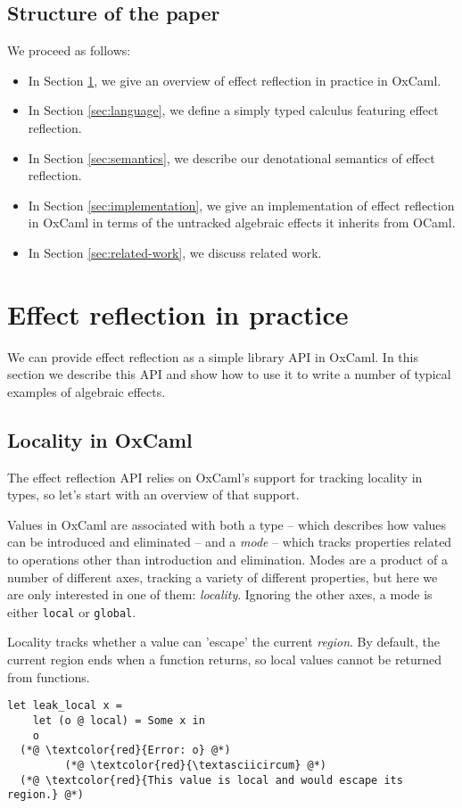 \documentclass[acmsmall, screen, review, anonymous]{acmart}
\theoremstyle{definition}
\begin{document}
\subsection{Structure of the paper} We proceed as follows:
\begin{itemize}
\item In Section \ref{sec:practice}, we give an overview of effect reflection in
  practice in OxCaml.
\item In Section \ref{sec:language}, we define a simply typed calculus featuring
  effect reflection.
\item In Section \ref{sec:semantics}, we describe our denotational
  semantics of effect reflection.
\item In Section \ref{sec:implementation}, we give an implementation of effect
  reflection in OxCaml in terms of the untracked algebraic effects it
  inherits from OCaml.
\item In Section \ref{sec:related-work}, we discuss related work.
\end{itemize}

\section{Effect reflection in practice}
\label{sec:practice}

We can provide effect reflection as a simple library API in OxCaml. In
this section we describe this API and show how to use it to write a
number of typical examples of algebraic effects.

\subsection{Locality in OxCaml}

The effect reflection API relies on OxCaml's support for tracking
locality in types, so let's start with an overview of that support.

Values in OxCaml are associated with both a type -- which describes how
values can be introduced and eliminated -- and a \emph{mode} -- which
tracks properties related to operations other than introduction and
elimination. Modes are a product of a number of different axes, tracking
a variety of different properties, but here we are only interested in
one of them: \emph{locality}. Ignoring the other axes, a mode is either
\lstinline[style=oxcaml]{local} or \lstinline[style=oxcaml]{global}.

Locality tracks whether a value can 'escape' the current
\emph{region}. By default, the current region ends when a function
returns, so local values cannot be returned from functions.
\begin{lstlisting}[style=oxcaml]
  let leak_local x =
    let (o @ local) = Some x in
    o
  (*@ \textcolor{red}{Error: o} @*)
         (*@ \textcolor{red}{\textasciicircum} @*)
  (*@ \textcolor{red}{This value is local and would escape its region.} @*)
\end{lstlisting}
\end{document}
